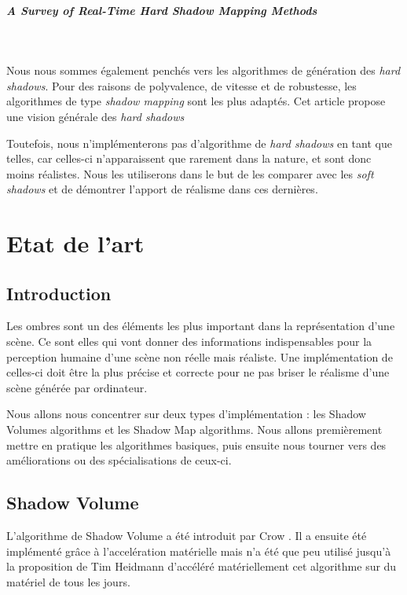\documentclass[a4paper,10pt]{report}
\begin{document}
\paragraph{\large A Survey of Real-Time Hard Shadow Mapping Methods}
~~\\
\cite{scherzer2011survey}

Nous nous sommes également penchés vers les algorithmes de génération des \textit{hard shadows}. Pour des raisons de polyvalence, de vitesse et de robustesse, les algorithmes de type \textit{shadow mapping} sont les plus adaptés. Cet article propose une vision générale des \textit{hard shadows}

Toutefois, nous n'implémenterons pas d'algorithme de \textit{hard shadows} en tant que telles, car celles-ci n'apparaissent que rarement dans la nature, et sont donc moins réalistes. Nous les utiliserons dans le but de les comparer avec les \textit{soft shadows} et de démontrer l'apport de réalisme dans ces dernières.

\chapter{Etat de l'art}

\section{Introduction}

Les ombres sont un des éléments les plus important dans la représentation d'une scène. Ce sont elles qui vont donner des informations indispensables pour la perception humaine d'une scène non réelle mais réaliste. Une implémentation de celles-ci doit être la plus précise et correcte pour ne pas briser le réalisme d'une scène générée par ordinateur.

Nous allons nous concentrer sur deux types d'implémentation : les Shadow Volumes algorithms et les Shadow Map algorithms. Nous allons premièrement mettre en pratique les algorithmes basiques, puis ensuite nous tourner vers des améliorations ou des spécialisations de ceux-ci.

\section{Shadow Volume}

L'algorithme de Shadow Volume a été introduit par Crow \cite{crow1977shadow}. Il a ensuite été implémenté grâce à l'accelération matérielle\cite{fuchs1986fast} mais n'a été que peu utilisé jusqu'à la proposition de Tim Heidmann d'accéléré matériellement cet algorithme sur du matériel de tous les jours.\cite{heidmann1991real}
\end{document}
